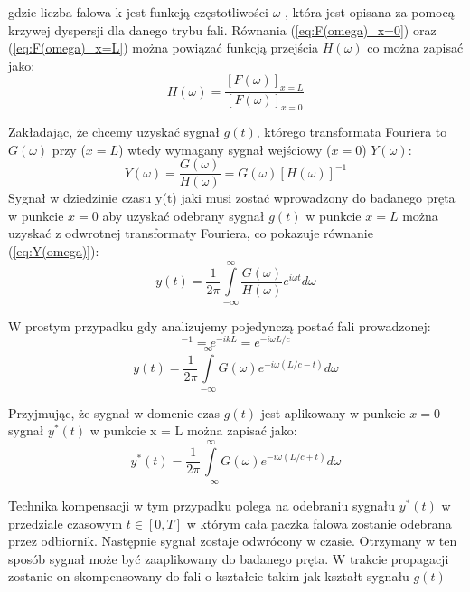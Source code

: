 gdzie liczba falowa k jest funkcją częstotliwości $\omega$  , która jest opisana za pomocą krzywej dyspersji dla danego trybu fali. Równania (\ref{eq:F(omega)_x=0}) oraz (\ref{eq:F(omega)_x=L}) można powiązać funkcją przejścia $H(\omega)$ co można zapisać jako:
\begin{equation}
H(\omega) = \frac{[F(\omega)]_{x=L}}{[F(\omega)]_{x=0}} \label{eq:h(omega)}
\end{equation}

Zakładając, że chcemy uzyskać sygnał $g(t)$, którego transformata Fouriera to $G(\omega)$ przy ($x = L$) wtedy wymagany sygnał wejściowy ($x = 0$) $Y(\omega)$:
\begin{equation}
Y(\omega) = \frac{G(\omega)}{H(\omega)} = G(\omega)[H(\omega)]^{-1} \label{eq:Y(omega)}
\end{equation}
Sygnał w dziedzinie czasu y(t) jaki musi zostać wprowadzony do badanego pręta w punkcie $x=0$ aby uzyskać odebrany sygnał $g(t)$ w punkcie $x=L$ można uzyskać z odwrotnej transformaty Fouriera, co pokazuje równanie (\ref{eq:Y(omega)}):
\begin{equation}
y(t) = \frac{1}{2\pi}\int\limits_{-\infty}^{\infty}\frac{G(\omega)}{H(\omega)}e^{i\omega t}d\omega \label{eq:y(t)}
\end{equation}

W prostym przypadku gdy analizujemy pojedynczą postać fali prowadzonej:
\begin{equation}
[H(\omega)]^{-1} = e^{-ikL} = e^{-i\omega L/c}
\end{equation}
\begin{equation}
y(t) = \frac{1}{2\pi}\int\limits_{-\infty}^{\infty}G(\omega)e^{-i\omega (L/c - t)}d\omega
\end{equation}

Przyjmując, że sygnał w domenie czas $g(t)$ jest aplikowany w punkcie $x = 0$ sygnał $y^*(t)$ w punkcie x = L można zapisać jako:
\begin{equation}
y^*(t) = \frac{1}{2\pi}\int\limits_{-\infty}^{\infty}G(\omega)e^{-i\omega (L/c + t)}d\omega
\end{equation}

Technika kompensacji w tym przypadku polega na odebraniu sygnału $y^*(t)$ w przedziale czasowym $t\in [0,T]$ w którym cała paczka falowa zostanie odebrana przez odbiornik. Następnie sygnał zostaje odwrócony w czasie. Otrzymany w ten sposób sygnał może być zaaplikowany do badanego pręta. W trakcie propagacji zostanie on skompensowany do fali o kształcie takim jak kształt sygnału $g(t)$

